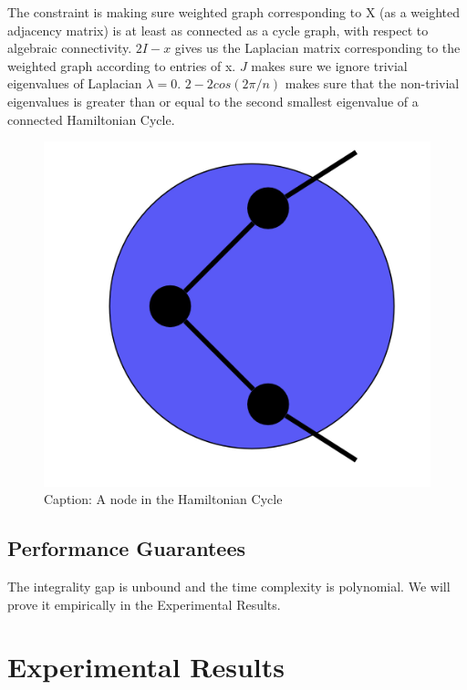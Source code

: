\documentclass{article}
\begin{document}
The constraint is making sure weighted graph corresponding to X (as a weighted adjacency matrix) is at least as connected as a cycle graph, with respect to algebraic connectivity. $2I-x$ gives us the Laplacian matrix corresponding to the weighted graph according to entries of x. $J$ makes sure we ignore trivial eigenvalues of Laplacian $\lambda = 0$. $2-2cos(2\pi/n)$ makes sure that the non-trivial eigenvalues is greater than or equal to the second smallest eigenvalue of a connected Hamiltonian Cycle.
\begin{figure}[!ht]
    \centering
    \includegraphics{assets/degrees.png}
    \caption{Caption: A node in the Hamiltonian Cycle}
    \label{fig:degrees}
\end{figure}
\subsection{Performance Guarantees}
The integrality gap is unbound and the time complexity is polynomial. We will prove it empirically in the Experimental Results.  

\section{Experimental Results}
\end{document}
